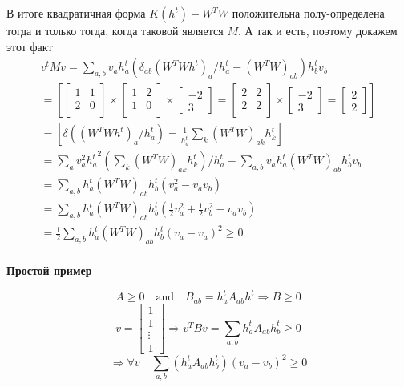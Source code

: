 \documentclass[oneside, final, 14pt]{extarticle}
\begin{document}
В итоге квадратичная форма $K(h^t) - W^TW$
положительна полу-определена тогда и только
тогда, когда таковой является $M$. А так и есть, поэтому
докажем этот факт
\begin{multline}
  v^t M v =
  \sum_{a,b}v_a h_a^t (\delta_{ab}(W^TWh^t)_a / h_a^t
  -(W^TW)_{ab})h_b^t v_b \\
  =
  \left[
    \begin{bmatrix}1 & 1 \\ 2 & 0 \\ \end{bmatrix} \times
    \begin{bmatrix}1 & 2 \\ 1 & 0 \\ \end{bmatrix} \times
    \begin{bmatrix} -2 \\ 3 \end{bmatrix}
    =
      \begin{bmatrix}2 & 2 \\ 2 & 2 \\ \end{bmatrix} \times
      \begin{bmatrix} -2 \\ 3 \end{bmatrix} =
      \begin{bmatrix} 2 \\ 2 \end{bmatrix}
  \right] \\
  =
  \left[
    \delta((W^TWh^t)_a / h_a^t) =
    \frac{1}{h_a^t} \sum_k (W^TW)_{ak} h_k^t
  \right] \\
  =
  \sum_a v_a^2 {h_a^t}^2
    \left(\sum_k(W^TW)_{ak}h_k^t\right) /h_a^t -
    \sum_{a,b} v_ah_a^t(W^TW)_{ab}h_b^tv_b \\
  = \sum_{a,b}h_a^t(W^TW)_{ab}h_b^t(v_a^2 - v_av_b) \\
  = \sum_{a,b}h_a^t(W^TW)_{ab}h_b^t(
    \frac{1}{2}v_a^2 + \frac{1}{2}v_b^2 - v_av_b) \\
  = \frac{1}{2} \sum_{a,b}h_a^t(W^TW)_{ab}h_b^t(v_a - v_a)^2 \geqslant 0 \\
\end{multline}

\textbf{Простой пример}

\[
  A \geqslant 0 \quad \text{and} \quad
  B_{ab} = h_a^tA_{ab}h^t
  \Rightarrow B \geqslant 0
\]
\[
  v =
  \begin{bmatrix}
    1 \\ 1 \\ \vdots \\ 1
  \end{bmatrix} \Rightarrow
  v^TBv = \sum_{a,b} h_a^tA_{ab}h_b^t \geqslant 0
\]
\[
  \Rightarrow \forall v \quad
  \sum_{a,b}\left(h_a^tA_{ab}h_b^t\right) (v_a - v_b)^2 \geqslant 0
\]
\end{document}
